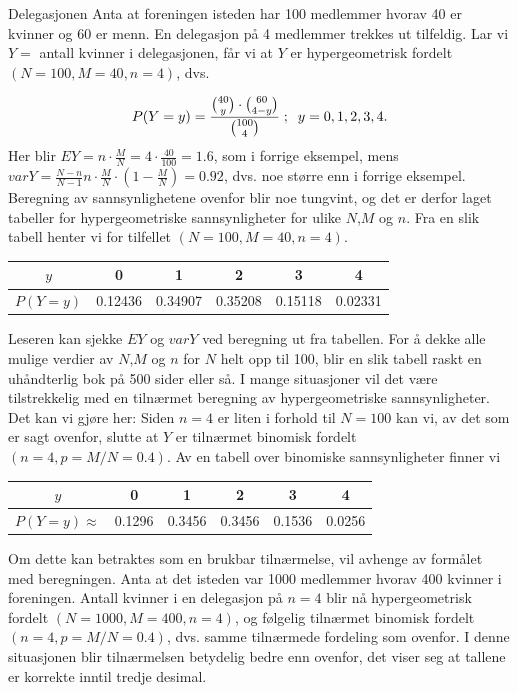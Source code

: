 \begin{eksempel}{Delegasjonen}
Anta at foreningen isteden har 100 medlemmer hvorav 40 er kvinner
og 60 er menn. En delegasjon på 4 medlemmer trekkes ut tilfeldig.
Lar vi $Y=$ antall kvinner i delegasjonen, får vi at $Y$ er
hypergeometrisk fordelt $(N=100, M=40, n=4)$, dvs.

\[ P(Y=y)= \frac{{{40}\choose{y}} \cdot {{60}\choose{4-y}}}{{{100}\choose{4}}}\; ;
                                               \;\; y=0,1,2,3,4. \]
\noindent Her blir $EY=n \cdot \frac{M}{N}=4 \cdot \frac{40}{100}=1.6$,
 som i forrige eksempel, mens 
 $varY=\frac{N-n}{N-1} n \cdot \frac{M}{N} \cdot (1-\frac{M}{N})=0.92$, dvs.
noe større enn i forrige eksempel. Beregning av sannsynlighetene
ovenfor blir noe tungvint, og det er derfor laget tabeller for
hypergeometriske sannsynligheter for ulike $N$,$M$ og $n$. Fra en
slik tabell henter vi for tilfellet $(N=100, M=40, n=4)$.
\begin{center}
\begin{tabular}{c|ccccc}
   $y$   &   0   &    1   &    2   &    3   &    4     \\ \hline
$P(Y=y)$& 0.12436 & 0.34907 & 0.35208 & 0.15118 & 0.02331
\end{tabular}
\end{center}
\noindent Leseren kan sjekke $EY$ og $varY$ ved beregning ut fra tabellen.
For å dekke alle mulige verdier av $N$,$M$ og $n$ for $N$ helt
opp til 100, blir en slik tabell raskt en uhåndterlig bok på 500
sider eller så. I mange situasjoner vil det være tilstrekkelig 
med en tilnærmet beregning av hypergeometriske sannsynligheter.
Det kan vi gjøre her: Siden $n=4$ er liten i forhold til $N=100$
kan vi, av det som er sagt ovenfor, slutte at $Y$ er tilnærmet
binomisk fordelt $(n=4, p=M/N=0.4)$. Av en tabell over binomiske
sannsynligheter finner vi

\begin{center}
\begin{tabular}{c|ccccc}
   $y$   &   0   &    1   &    2   &    3   &    4      \\ \hline
$P(Y=y) \approx $& 0.1296 & 0.3456 & 0.3456 & 0.1536 & 0.0256
\end{tabular}
\end{center}

\noindent Om dette kan betraktes som en brukbar tilnærmelse, vil avhenge av
formålet med beregningen. Anta at det isteden
var 1000 medlemmer hvorav 400 kvinner i foreningen. Antall
kvinner i en delegasjon på $n=4$ blir nå hypergeometrisk fordelt
$(N=1000, M=400, n=4)$, og følgelig tilnærmet binomisk fordelt
$(n=4, p=M/N=0.4)$, dvs. samme tilnærmede fordeling som ovenfor.
I denne situasjonen blir tilnærmelsen betydelig bedre enn
ovenfor, det viser seg at tallene er korrekte inntil tredje
desimal.
\end{eksempel}

